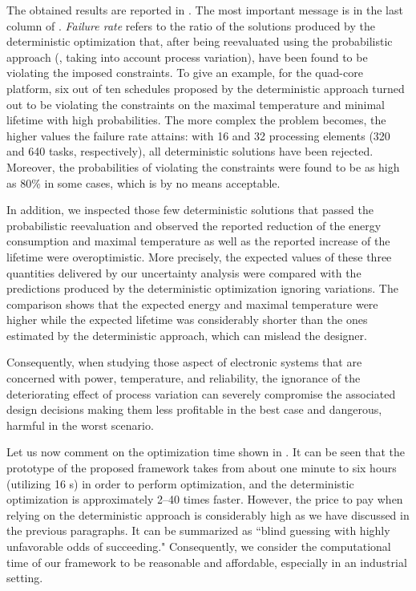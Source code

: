 The obtained results are reported in .
The most important message is in the last column of .
\emph{Failure rate} refers to the ratio of the solutions produced by the deterministic optimization that, after being reevaluated using the probabilistic approach (\ie, taking into account process variation), have been found to be violating the imposed constraints.
To give an example, for the quad-core platform, six out of ten schedules proposed by the deterministic approach turned out to be violating the constraints on the maximal temperature and minimal lifetime with high probabilities.
The more complex the problem becomes, the higher values the failure rate attains: with 16 and 32 processing elements (320 and 640 tasks, respectively), all deterministic solutions have been rejected.
Moreover, the probabilities of violating the constraints were found to be as high as 80\% in some cases, which is by no means acceptable.

In addition, we inspected those few deterministic solutions that passed the probabilistic reevaluation and observed the reported reduction of the energy consumption and maximal temperature as well as the reported increase of the lifetime were overoptimistic.
More precisely, the expected values of these three quantities delivered by our uncertainty analysis were compared with the predictions produced by the deterministic optimization ignoring variations.
The comparison shows that the expected energy and maximal temperature were higher while the expected lifetime was considerably shorter than the ones estimated by the deterministic approach, which can mislead the designer.

Consequently, when studying those aspect of electronic systems that are concerned with power, temperature, and reliability, the ignorance of the deteriorating effect of process variation can severely compromise the associated design decisions making them less profitable in the best case and dangerous, harmful in the worst scenario.

Let us now comment on the optimization time shown in .
It can be seen that the prototype of the proposed framework takes from about one minute to six hours (utilizing 16 s) in order to perform optimization, and the deterministic optimization is approximately 2--40 times faster.
However, the price to pay when relying on the deterministic approach is considerably high as we have discussed in the previous paragraphs.
It can be summarized as ``blind guessing with highly unfavorable odds of succeeding."
Consequently, we consider the computational time of our framework to be reasonable and affordable, especially in an industrial setting.


